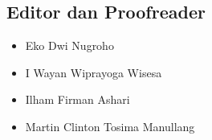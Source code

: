 \documentclass[10pt,a5paper,openany]{report}
\begin{document}
\subsection*{Editor dan Proofreader}
\begin{itemize}[label=]
	\item Eko Dwi Nugroho
	\item I Wayan Wiprayoga Wisesa
	\item Ilham Firman Ashari
	\item Martin Clinton Tosima Manullang
\end{itemize}


\renewcommand{\bibname}{Bibliography}
\cleardoublepage
{}



\cleardoublepage

\end{document}

